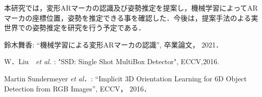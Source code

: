 \documentclass{jsarticle}
\begin{document}
本研究では，変形ARマーカの認識及び姿勢推定を提案し，機械学習によってARマーカの座標位置，姿勢を推定できる事を確認した．今後は，提案手法のよる実世界での姿勢推定を研究を行う予定である．

%
%
%

\begin{thebibliography}{1}

{\scriptsize
{}
鈴木舞香: ``機械学習による変形ARマーカの認識'', 卒業論文， 2021． }

{\scriptsize
{}
W．Liu　{\em et al. }: "SSD: Single Shot MultiBox Detector", ECCV,2016.}

{\scriptsize 
{}
Martin Sundermeyer {\em et al．}: ``Implicit 3D Orientation Learning for 6D Object Detection from RGB Images'', ECCV， 2016．}

\end{thebibliography}
\end{document}
